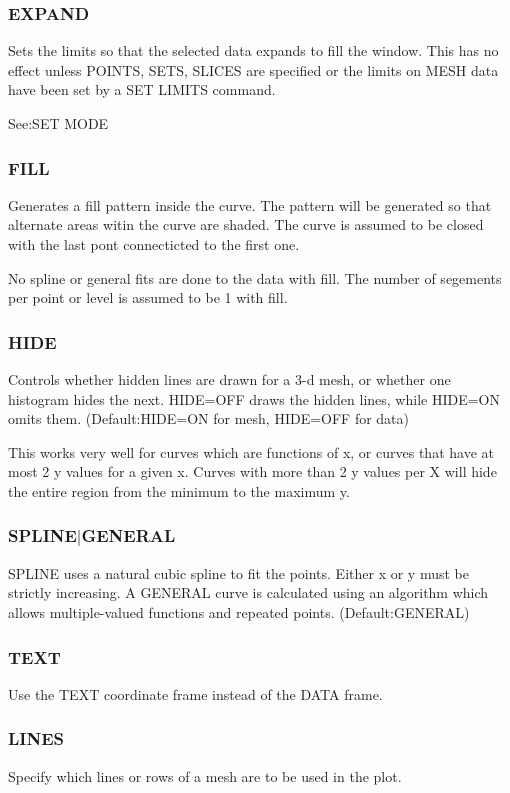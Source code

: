 \subsubsection{EXPAND}
Sets  the  limits so that the selected data expands to fill the window.
This has no effect unless POINTS, SETS, SLICES  are  specified  or  the
limits on MESH data have been set by a SET LIMITS command.  

See:SET MODE 
\subsubsection{FILL}
Generates  a  fill  pattern  inside  the  curve.   The  pattern will be
generated so that alternate areas witin  the  curve  are  shaded.   The
curve  is  assumed  to be closed with the last pont connecticted to the
first one.  

No  spline  or general fits are done to the data with fill.  The number
of segements per point or level is assumed to be 1 with fill.  
\subsubsection{HIDE}
Controls  whether hidden lines are drawn for a 3-d mesh, or whether one
histogram hides the next.   HIDE=OFF  draws  the  hidden  lines,  while
HIDE=ON omits them.  
(Default:HIDE=ON for mesh, HIDE=OFF for data) 

This  works  very  well  for curves which are functions of x, or curves
that have at most 2 y values for a given x.  Curves with more than 2  y
values  per  X  will  hide  the  entire  region from the minimum to the
maximum y.  
\subsubsection{SPLINE$|$GENERAL}
SPLINE  uses  a  natural cubic spline to fit the points.  Either x or y
must be strictly increasing.  A GENERAL curve is  calculated  using  an
algorithm  which  allows multiple-valued functions and repeated points.
(Default:GENERAL) 
\subsubsection{TEXT}
Use the TEXT coordinate frame instead of the DATA frame.  
\subsubsection{LINES}
Specify which lines or rows of a mesh are to be used in the plot.  
